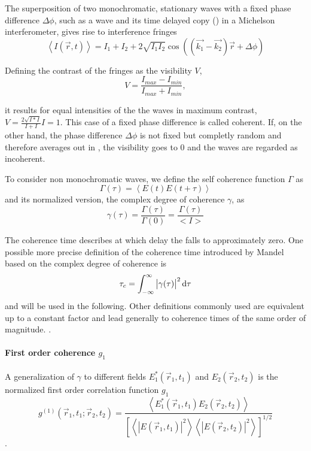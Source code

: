 The superposition of two monochromatic, stationary waves with a fixed phase difference $\Delta \phi$, such as a wave and its time delayed copy () in a Michelson interferometer, gives rise to interference fringes
\begin{equation}
	\left<I(\vec{r},t)\right>=I_1+I_2+2\sqrt{I_1I_2}\cos\left((\vec{k_1}-\vec{k_2})\vec{r}+\Delta \phi\right)
\label{eq:interference}
\end{equation}

Defining the contrast of the fringes as the visibility $V$,
\begin{equation}
	V=\frac{I_{max}-I_{min}}{I_{max}+I_{min}} ,
\end{equation} 

it results for equal intensities of the the waves in maximum contrast,  $V=\frac{2\sqrt{I*I}}{I+I}I=1$. This case of a fixed phase difference is called coherent.
If, on the other hand, the phase difference $\Delta \phi$ is not fixed but completly random and therefore averages out in , the visibility goes to 0 and the waves are regarded as incoherent.

To consider non monochromatic waves, we define the self coherence function $\Gamma$ as 
\begin{equation}
\Gamma(\tau)=\left< E(t)E(t+\tau)\right>
\end{equation}
and its normalized version, the complex degree of coherence $\gamma$, as
\begin{equation}
\gamma(\tau)=\frac{\Gamma(\tau)}{\Gamma(0)} =  \frac{\Gamma(\tau)}{<I>}
\end{equation} \cite{zernike1938,loudon2000}

The coherence time describes at which delay the falls to approximately zero. One possible more precise definition of the coherence time introduced by Mandel based on the complex degree of coherence is
\begin{equation}
\tau_c = \int_{-\infty}^{\infty} \left| \gamma(\tau)\right|^2 \operatorname{\mathrm{d}\!} \tau 
\end{equation} and will be used in the following. Other definitions commonly used are equivalent up to a constant factor and lead generally to coherence times of the same order of magnitude. \cite{mandel1959,goodman2000}.






\paragraph{First order coherence $g_1$}
A generalization of $\gamma$  to different fields  $E_1^*(\vec{r}_1,t_1)$ and $E_2(\vec{r}_2,t_2)$ is the normalized first order correlation function $g_1$ \cite{agarwal2013}
\begin{equation}
	g^{(1)}(\vec{r}_1,t_1;\vec{r}_2,t_2)= \frac
	{\left< E_1^*(\vec{r}_1,t_1)E_2(\vec{r}_2,t_2) \right>}
	{\left[ \left<\left | E(\vec{r}_1,t_1)\right |^2 \right> \left< \left |E(\vec{r}_2,t_2)\right |^2 \right>\right]^{1/2}}	
\end{equation}.






